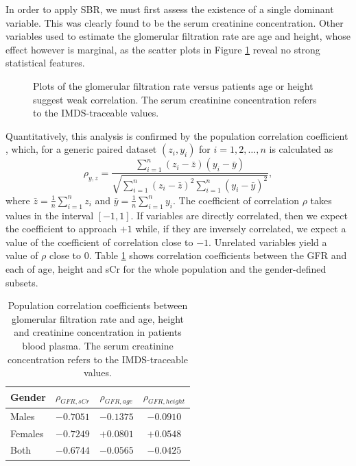 \documentclass[10pt,final]{siamltex}
\begin{document}
In order to apply SBR, we must first assess the existence of a single dominant variable. This was clearly found to be the serum creatinine concentration. Other variables used to estimate the glomerular filtration rate are age and height, whose effect however is marginal, as the scatter plots in Figure \ref{recessive} reveal no strong statistical features.
%
\begin{figure}[ht]
  \centering
  \caption{Plots of the glomerular filtration rate versus patients age or height suggest weak correlation. The serum creatinine concentration refers to the IMDS-traceable values.}
  \label{recessive}
\end{figure}
%
Quantitatively, this analysis is confirmed by the population correlation coefficient \cite{mukaka}, which, for a generic paired dataset $(z_i, y_i)$ for $i = 1, 2, \ldots, n$ is calculated as
%
\begin{equation}
  \rho_{y,z} = \frac{\sum_{i = 1}^n{(z_i-\bar{z})(y_i-\bar{y})}}
  {\sqrt{\sum_{i=1}^n{(z_i-\bar{z})^2}\sum_{i=1}^n{(y_i-\bar{y})^2}}},
\end{equation}
%
where $\bar{z}=\tfrac{1}{n}\sum_{i=1}^nz_i$ and $\bar{y}=\tfrac{1}{n}\sum_{i=1}^ny_i$. The coefficient of correlation $\rho$ takes values in the interval $[-1,1]$. If variables are directly correlated, then we expect the coefficient to approach $+1$ while, if they are inversely correlated, we expect a value of the coefficient of correlation close to $-1$. Unrelated variables yield a value of $\rho$ close to $0$. Table \ref{corr} shows correlation coefficients between the GFR and each of age, height and sCr for the whole population and the gender-defined subsets.
%
\begin{table}[ht]
  \centering
  \begin{tabular}{|l|c|c|c|}
    \hline
    \textbf{Gender}&$\rho_{\mathit{GFR},sCr}$&$\rho_{\mathit{GFR},age}$&$\rho_{\mathit{GFR},height}$\\
    \hline
    \textrm{Males}     & $-0.7051$ & $-0.1375$ & $-0.0910$  \\
    \hline
    \textrm{Females}   & $-0.7249$ &  $+0.0801$ &  $+0.0548$  \\
    \hline
    \textrm{Both}      & $-0.6744$ & $-0.0565$ & $-0.0425$  \\
    \hline
  \end{tabular}
  \caption{Population correlation coefficients between glomerular filtration rate and age, height and creatinine concentration in patients blood plasma. The serum creatinine concentration refers to the IMDS-traceable values.}
  \label{corr}
\end{table}
\end{document}
